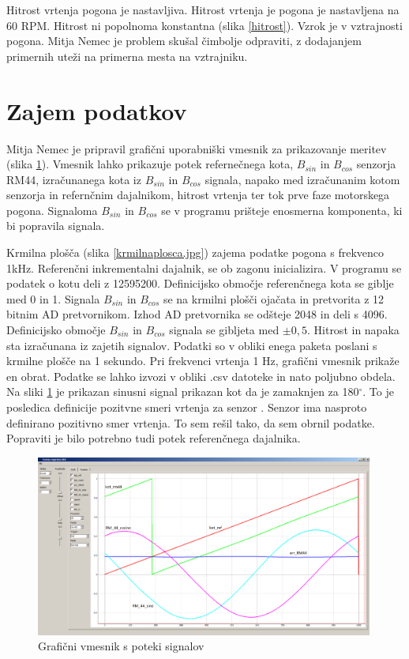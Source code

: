 Hitrost vrtenja pogona je nastavljiva.
Hitrost vrtenja je pogona je nastavljena na 60 RPM. Hitrost ni popolnoma konstantna (slika \ref{hitrost}). Vzrok je v vztrajnosti pogona. Mitja Nemec je problem skušal čimbolje odpraviti, z dodajanjem primernih uteži na primerna mesta na vztrajniku.
\newpage
\section{Zajem podatkov}
Mitja Nemec je pripravil grafični uporabniški vmesnik za prikazovanje meritev (slika \ref{GUI.png}).
Vmesnik lahko prikazuje potek refernečnega kota, $B_{sin}$ in $B_{cos}$ senzorja RM44, izračunanega kota iz $B_{sin}$ in $B_{cos}$ signala, napako med izračunanim kotom senzorja in refernčnim dajalnikom, hitrost vrtenja ter tok prve faze motorskega pogona. Signaloma $B_{sin}$ in $B_{cos}$ se v programu prišteje enosmerna komponenta, ki bi popravila signala.

Krmilna plošča (slika \ref{krmilnaplosca.jpg}) zajema podatke pogona s frekvenco 1kHz.
Referenčni inkrementalni dajalnik, se ob zagonu inicializira. V programu se podatek o kotu deli z 12595200. Definicijsko območje referenčnega kota se giblje med 0 in 1.
Signala $B_{sin}$ in $B_{cos}$  se na krmilni plošči ojačata in pretvorita z 12 bitnim AD pretvornikom. Izhod AD pretvornika se odšteje 2048 in deli s 4096. Definicijsko območje  $B_{sin}$ in $B_{cos}$  signala se gibljeta med $\pm0,5$.
Hitrost in napaka sta izračunana iz zajetih signalov.
Podatki so v obliki enega paketa poslani s krmilne plošče na 1 sekundo. Pri frekvenci vrtenja 1 Hz, grafični vmesnik prikaže en obrat.
Podatke se lahko izvozi v obliki .csv datoteke in nato poljubno obdela.
Na sliki  \ref{GUI.png} je prikazan sinusni signal prikazan kot da je zamaknjen za 180$\mathrm{^\circ}$. To je posledica definicije pozitvne smeri vrtenja za senzor \cite{RM44}. Senzor ima nasproto definirano pozitivno smer vrtenja. To sem rešil tako, da sem obrnil podatke. Popraviti je bilo potrebno tudi potek referenčnega dajalnika.
\begin{figure}[!ht]
	\centering
	\includegraphics[width=0.99\textwidth]{./Slike/GUI.png}
	\caption{Grafični vmesnik s poteki signalov}
	\label{GUI.png}
\end{figure}

